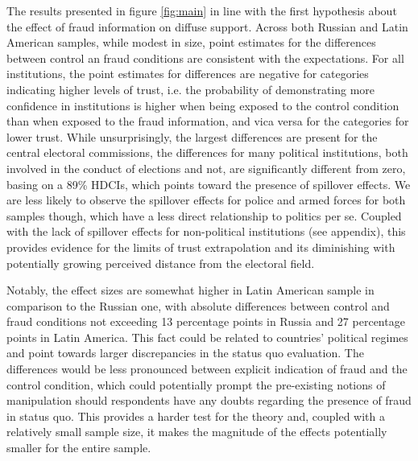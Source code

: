 \documentclass[11pt, ngerman,english,a4]{article}
\begin{document}
The results presented in figure \ref{fig:main} in line with the first hypothesis about the effect of fraud information on diffuse support. Across both Russian and Latin American samples, while modest in size, point estimates for the differences between control an fraud conditions are consistent with the expectations. For all institutions, the point estimates for differences are negative for categories indicating higher levels of trust, i.e. the probability of demonstrating more confidence in institutions is higher when being exposed to the control condition than when exposed to the fraud information, and vica versa for the categories for lower trust. While unsurprisingly, the largest differences are present for the central electoral commissions, the differences for many political institutions, both involved in the conduct of elections and not, are significantly different from zero, basing on a 89\% HDCIs, which points toward the presence of spillover effects. We are less likely to observe the spillover effects for police and armed forces for both samples though, which have a less direct relationship to politics per se. Coupled with the lack of spillover effects for non-political institutions (see appendix), this provides evidence for the limits of trust extrapolation and its diminishing with potentially growing perceived distance from the electoral field. 

Notably, the effect sizes are somewhat higher in Latin American sample in comparison to the Russian one, with absolute differences between control and fraud conditions not exceeding 13 percentage points in Russia and 27 percentage points in Latin America. This fact could be related to countries' political regimes and point towards larger discrepancies in the status quo evaluation. The differences would be less pronounced between explicit indication of fraud and the control condition, which could potentially prompt the pre-existing notions of manipulation should respondents have any doubts regarding the presence of fraud in status quo. This provides a harder test for the theory and, coupled with a relatively small sample size, it makes the magnitude of the effects potentially smaller for the entire sample. 
\end{document}
